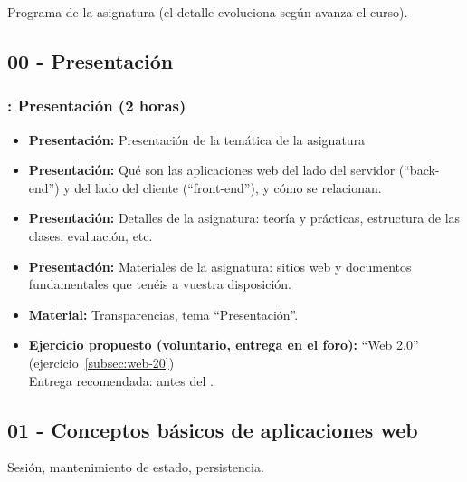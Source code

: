 \documentclass[a4paper,12pt]{article}
\begin{document}
Programa de la asignatura (el detalle evoluciona según avanza el curso).

\subsection{00 - Presentación}

\subsubsection{\martesA: Presentación  (2 horas)}
\label{cal:martesA}

\begin{itemize}
\item \textbf{Presentación:} Presentación de la temática de la asignatura
\item \textbf{Presentación:} Qué son las aplicaciones web del lado del servidor (``back-end'') y del lado del cliente (``front-end''), y cómo se relacionan.
\item \textbf{Presentación:} Detalles de la asignatura: teoría y prácticas, estructura de las clases, evaluación, etc.
\item \textbf{Presentación:} Materiales de la asignatura: sitios web y documentos fundamentales que tenéis a vuestra disposición.
\item \textbf{Material:} Transparencias, tema ``Presentación''.
\item \textbf{Ejercicio propuesto (voluntario, entrega en el foro):} ``Web 2.0'' (ejercicio~\ref{subsec:web-20}) \\
  Entrega recomendada: antes del \martesB.
\end{itemize}


\subsection{01 - Conceptos básicos de aplicaciones web}

Sesión, mantenimiento de estado, persistencia.
\end{document}
